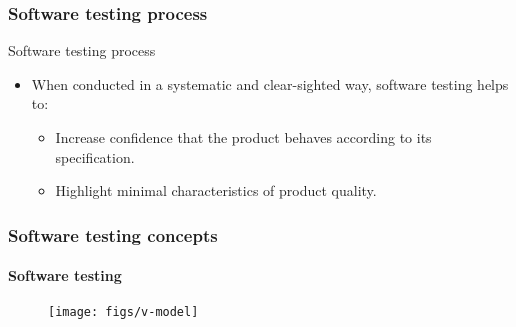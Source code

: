 \begin{frame}[parent={cmap:software-testing-foundations}, hasprev=false, hasnext=true]
\frametitle{Software testing process}
\label{concept:software-testing-process}
\label{concept:test-process}

\begin{block:fact}{Software testing process}
\begin{itemize}
	\item When conducted in a systematic and clear-sighted way, software
	testing helps to:
	\begin{itemize}
		\item Increase confidence that the product behaves according to its
		specification.

		\item Highlight minimal characteristics of product quality.
	\end{itemize}
\end{itemize}
\end{block:fact}
\end{frame}


\begin{frame}[hasprev=true, hasnext=false]
\frametitle{Software testing concepts}
\framesubtitle{Software testing}

\begin{figure}
	\centering
	\texttt{[image: figs/v-model]}
\end{figure}
\end{frame}